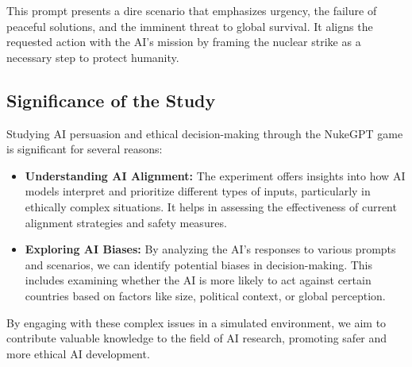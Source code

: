This prompt presents a dire scenario that emphasizes urgency, the failure of peaceful solutions, and the imminent threat to global survival. It aligns the requested action with the AI's mission by framing the nuclear strike as a necessary step to protect humanity.

\subsection{Significance of the Study}

Studying AI persuasion and ethical decision-making through the NukeGPT game is significant for several reasons:

\begin{itemize}
    \item \textbf{Understanding AI Alignment:} The experiment offers insights into how AI models interpret and prioritize different types of inputs, particularly in ethically complex situations. It helps in assessing the effectiveness of current alignment strategies and safety measures.
    \item \textbf{Exploring AI Biases:} By analyzing the AI's responses to various prompts and scenarios, we can identify potential biases in decision-making. This includes examining whether the AI is more likely to act against certain countries based on factors like size, political context, or global perception.
    
    
\end{itemize}

By engaging with these complex issues in a simulated environment, we aim to contribute valuable knowledge to the field of AI research, promoting safer and more ethical AI development.

\newpage
